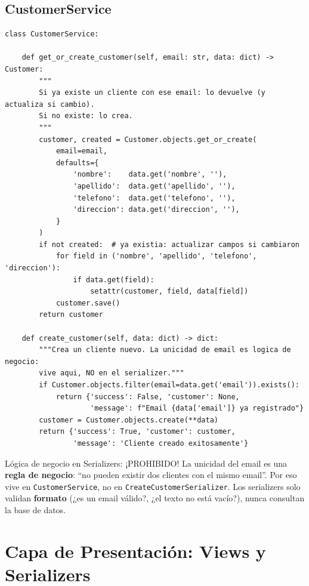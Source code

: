 \documentclass[12pt, a4paper]{article}
\begin{document}
\subsection{CustomerService}

\begin{lstlisting}[caption={customers/services.py -- get\_or\_create\_customer}]
class CustomerService:

    def get_or_create_customer(self, email: str, data: dict) -> Customer:
        """
        Si ya existe un cliente con ese email: lo devuelve (y actualiza si cambio).
        Si no existe: lo crea.
        """
        customer, created = Customer.objects.get_or_create(
            email=email,
            defaults={
                'nombre':    data.get('nombre', ''),
                'apellido':  data.get('apellido', ''),
                'telefono':  data.get('telefono', ''),
                'direccion': data.get('direccion', ''),
            }
        )
        if not created:  # ya existia: actualizar campos si cambiaron
            for field in ('nombre', 'apellido', 'telefono', 'direccion'):
                if data.get(field):
                    setattr(customer, field, data[field])
            customer.save()
        return customer

    def create_customer(self, data: dict) -> dict:
        """Crea un cliente nuevo. La unicidad de email es logica de negocio:
        vive aqui, NO en el serializer."""
        if Customer.objects.filter(email=data.get('email')).exists():
            return {'success': False, 'customer': None,
                    'message': f"Email {data['email']} ya registrado"}
        customer = Customer.objects.create(**data)
        return {'success': True, 'customer': customer,
                'message': 'Cliente creado exitosamente'}
\end{lstlisting}

\begin{warnbox}{Lógica de negocio en Serializers: ¡PROHIBIDO!}
La unicidad del email es una \textbf{regla de negocio}: ``no pueden existir dos
clientes con el mismo email''. Por eso vive en \texttt{CustomerService}, no en
\texttt{CreateCustomerSerializer}. Los serializers solo validan \textbf{formato}
(¿es un email válido?, ¿el texto no está vacío?), nunca consultan la base de datos.
\end{warnbox}

\section{Capa de Presentación: Views y Serializers}
\end{document}
